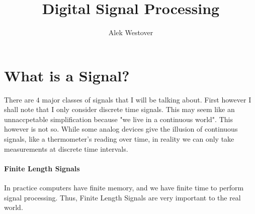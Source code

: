 \documentclass{article}[11pt]
\author{Alek Westover}
\title{Digital Signal Processing}
\begin{document}
\maketitle
\tableofcontents


\section{What is a Signal?}
There are $4$ major classes of signals that I will be talking about. 
First however I shall note that I only consider discrete time signals.
This may seem like an unnaccpetable simplification because "we live in a continuous world".
This however is not so.
While some analog devices give the illusion of continuous signals, like a thermometer's reading over time, in reality we can only take measurements at discrete time intervals. 

\paragraph{Finite Length Signals}
In practice computers have finite memory, and we have finite time to perform signal processing. 
Thus, Finite Length Signals are very important to the real world.
\end{document}
